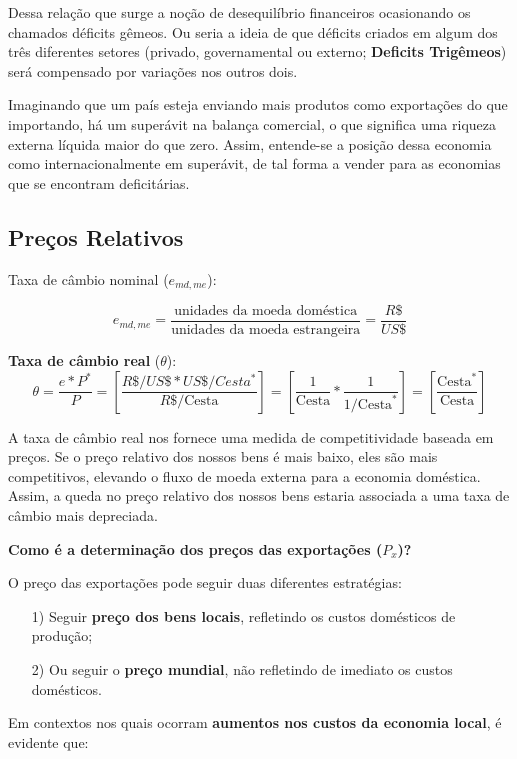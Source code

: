 \documentclass[a4paper,12pt]{article}[abntex2]
\begin{document}
Dessa relação que surge a noção de desequilíbrio financeiros ocasionando os chamados déficits gêmeos.  
Ou seria a ideia de que déficits criados em algum dos três diferentes setores (privado, governamental ou externo; \textbf{Deficits Trigêmeos}) será compensado por variações nos outros dois.


Imaginando que um país esteja enviando mais produtos como exportações do que importando, há um superávit na balança comercial, o que significa uma riqueza externa líquida maior do que zero. Assim, entende-se a posição dessa economia como internacionalmente em superávit, de tal forma a vender para as economias que se encontram deficitárias.


\subsection{\textbf{Preços Relativos}}
Taxa de câmbio nominal ($e_{md,me}$):

\[
e_{md,me} = \frac{\text{unidades da moeda doméstica}}{\text{unidades da moeda estrangeira}}
= \frac{R\$}{US\$}
\]

\textbf{Taxa de câmbio real} ($\theta$):
\[
\theta = \frac{e \ast P^{\ast}}{P} = 
\left[
\frac{R\$/US\$ \ast US\$/Cesta^\ast}{R\$/\text{Cesta}}
\right] = 
\left[
\frac{1}{\text{Cesta}} \ast \frac{1}{1/\text{Cesta}^{\ast}}
\right] = 
\left[
\frac{\text{Cesta}^{\ast}}{\text{Cesta}}
\right]
\]


A taxa de câmbio real nos fornece uma medida de competitividade baseada em preços.  
Se o preço relativo dos nossos bens é mais baixo, eles são mais competitivos, elevando o fluxo de moeda externa para a economia doméstica.  
Assim, a queda no preço relativo dos nossos bens estaria associada a uma taxa de câmbio mais depreciada.


\textbf{Como é a determinação dos preços das exportações ($P_x$)?}

O preço das exportações pode seguir duas diferentes estratégias:
\begin{itemize}
    \item[1)] Seguir \textbf{preço dos bens locais}, refletindo os custos domésticos de produção;
    \item[2)] Ou seguir o \textbf{preço mundial}, não refletindo de imediato os custos domésticos.
\end{itemize}

Em contextos nos quais ocorram \textbf{aumentos nos custos da economia local}, é evidente que:
\end{document}
